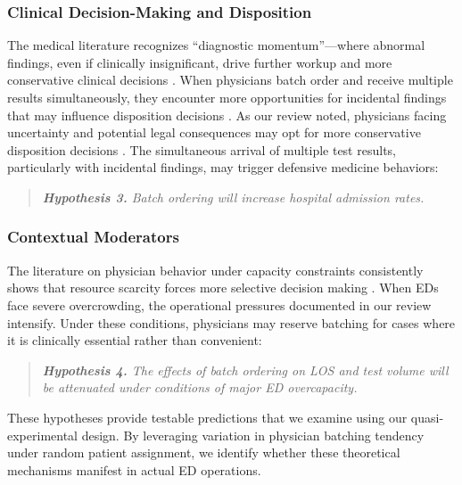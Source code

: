 \documentclass[,,blindrev]{informs}
\begin{document}
\subsubsection{Clinical Decision-Making and
Disposition}\label{clinical-decision-making-and-disposition}

The medical literature recognizes ``diagnostic momentum''---where
abnormal findings, even if clinically insignificant, drive further
workup and more conservative clinical decisions
\citep[\citet{featherston2020decision}]{coen2022clinical}. When
physicians batch order and receive multiple results simultaneously, they
encounter more opportunities for incidental findings that may influence
disposition decisions
\citep[\citet{berlin2011incidentaloma}]{lumbreras2010incidental}. As our
review noted, physicians facing uncertainty and potential legal
consequences may opt for more conservative disposition decisions
\citep[\citet{lam2020why}]{rao2012overuse}. The simultaneous arrival of
multiple test results, particularly with incidental findings, may
trigger defensive medicine behaviors:

\vspace{1em}
\begin{quote}
\small
\textit{\textbf{Hypothesis 3.} Batch ordering will increase hospital admission rates.}
\end{quote}

\subsubsection{Contextual Moderators}\label{contextual-moderators}

The literature on physician behavior under capacity constraints
consistently shows that resource scarcity forces more selective decision
making \citep[\citet{kc2009impact}]{kuntz2014stress}. When EDs face
severe overcrowding, the operational pressures documented in our review
intensify. Under these conditions, physicians may reserve batching for
cases where it is clinically essential rather than convenient:

\vspace{1em}
\begin{quote}
\small
\textit{\textbf{Hypothesis 4.} The effects of batch ordering on LOS and test volume will be attenuated under conditions of major ED overcapacity.}
\end{quote}

These hypotheses provide testable predictions that we examine using our
quasi-experimental design. By leveraging variation in physician batching
tendency under random patient assignment, we identify whether these
theoretical mechanisms manifest in actual ED operations.
\end{document}
